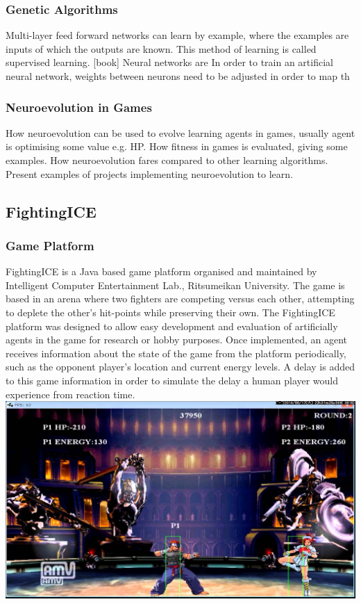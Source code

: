 \documentclass[11pt,a4paper]{article}
\begin{document}
\subsubsection{Genetic Algorithms}
Multi-layer feed forward networks can learn by example, where the examples are inputs of which the outputs are known. This method of learning is called supervised learning. [book]
Neural networks are In order to train an artificial neural network, weights between neurons need to be adjusted in order to map th

\subsubsection{Neuroevolution in Games}
How neuroevolution can be used to evolve learning agents in games, usually agent is optimising some value e.g. HP. How fitness in games is evaluated, giving some examples. How neuroevolution fares compared to other learning algorithms. Present examples of projects implementing neuroevolution to learn.

\subsection{FightingICE}
\subsubsection{Game Platform}
FightingICE is a Java based game platform organised and maintained by Intelligent Computer Entertainment Lab., Ritsumeikan University. The game is based in an arena where two fighters are competing versus each other, attempting to deplete the other's hit-points while preserving their own. The FightingICE platform was designed to allow easy development and evaluation of artificially agents in the game for research or hobby purposes. Once implemented, an agent receives information about the state of the game from the platform periodically, such as the opponent player's location and current energy levels. A delay is added to this game information in order to simulate the delay a human player would experience from reaction time.\\
\includegraphics[width=\textwidth]{fightingICE}
\end{document}
